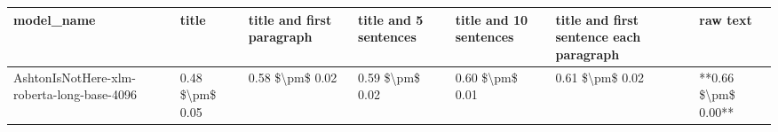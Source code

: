 \begin{tabular}{lllllll}
\toprule
                                model\_name &           title & title and first paragraph & title and 5 sentences & title and 10 sentences & title and first sentence each paragraph &            raw text \\
\midrule
AshtonIsNotHere-xlm-roberta-long-base-4096 & 0.48 \$\textbackslash pm\$ 0.05 &           0.58 \$\textbackslash pm\$ 0.02 &       0.59 \$\textbackslash pm\$ 0.02 &        0.60 \$\textbackslash pm\$ 0.01 &                         0.61 \$\textbackslash pm\$ 0.02 & **0.66 \$\textbackslash pm\$ 0.00** \\
\bottomrule
\end{tabular}
